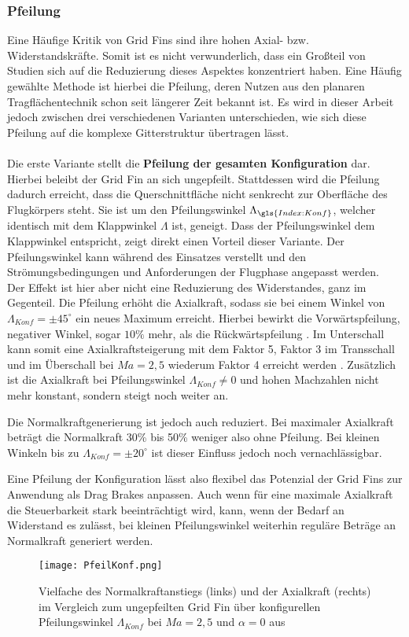 \subsubsection{Pfeilung}
Eine Häufige Kritik von Grid Fins sind ihre hohen Axial- bzw. Widerstandskräfte. Somit ist es nicht verwunderlich, dass ein Großteil von Studien sich auf die Reduzierung dieses Aspektes konzentriert haben. Eine Häufig gewählte Methode ist hierbei die Pfeilung, deren Nutzen aus den planaren Tragflächentechnik schon seit längerer Zeit bekannt ist. Es wird in dieser Arbeit jedoch zwischen drei verschiedenen Varianten unterschieden, wie sich diese Pfeilung auf die komplexe Gitterstruktur übertragen lässt.\\
~\\
Die erste Variante stellt die \textbf{Pfeilung der gesamten Konfiguration} dar. Hierbei beleibt der Grid Fin an sich ungepfeilt. Stattdessen wird die Pfeilung dadurch erreicht, dass die Querschnittfläche nicht senkrecht zur Oberfläche des Flugkörpers steht. Sie ist um den Pfeilungswinkel $\Lambda_{\gls{Index:Konf}}$, welcher identisch mit dem Klappwinkel $\Lambda$ ist, geneigt. Dass der Pfeilungswinkel dem Klappwinkel entspricht, zeigt direkt einen Vorteil dieser Variante. Der Pfeilungswinkel kann während des Einsatzes verstellt und den Strömungsbedingungen und Anforderungen der Flugphase angepasst werden.\\
Der Effekt ist hier aber nicht eine Reduzierung des Widerstandes, ganz im Gegenteil. Die Pfeilung erhöht die Axialkraft, sodass sie bei einem Winkel von $\Lambda_{Konf} = \pm45^\circ$ ein neues Maximum erreicht. Hierbei bewirkt die Vorwärtspfeilung, negativer Winkel, sogar $10\%$ mehr, als die Rückwärtspfeilung \cite{LambdaKonf}. Im Unterschall kann somit eine Axialkraftsteigerung mit dem Faktor 5, Faktor 3 im Transschall und im Überschall bei $Ma = 2,5$ wiederum Faktor 4 erreicht werden \cite{LambdaKonf}. Zusätzlich ist die Axialkraft bei Pfeilungswinkel $\Lambda_{Konf} \neq 0$ und hohen Machzahlen nicht mehr konstant, sondern steigt noch weiter an.

Die Normalkraftgenerierung ist jedoch auch reduziert. Bei maximaler Axialkraft beträgt die Normalkraft 30\% bis 50\% weniger also ohne Pfeilung. Bei kleinen Winkeln bis zu $\Lambda_{Konf} = \pm20^\circ$ ist dieser Einfluss jedoch noch vernachlässigbar.

Eine Pfeilung der Konfiguration lässt also flexibel das Potenzial der Grid Fins zur Anwendung als Drag Brakes anpassen. Auch wenn für eine maximale Axialkraft die Steuerbarkeit stark beeinträchtigt wird, kann, wenn der Bedarf an Widerstand es zulässt, bei kleinen Pfeilungswinkel weiterhin reguläre Beträge an Normalkraft generiert werden.
\begin{figure}[h]
	\centering
	\texttt{[image: PfeilKonf.png]}
	\caption{Vielfache des Normalkraftanstiegs (links) und der Axialkraft (rechts) im Vergleich zum ungepfeilten Grid Fin über konfigurellen Pfeilungswinkel $\Lambda_{Konf}$ bei $Ma = 2,5$ und $\alpha = 0$ aus \cite{LambdaKonf}}
\end{figure}

